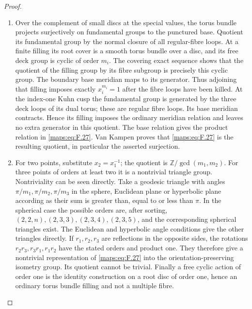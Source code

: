\documentclass[11pt,a4paper]{article}
\numberwithin{equation}{section}
\theoremstyle{definition}
\begin{document}
\begin{proof}
\begin{enumerate}[label=\arabic*.]
\item Over the complement of small discs at the special values,
the torus bundle projects surjectively on fundamental groups
to the punctured base.  Quotient its fundamental group by the
normal closure of all regular-fibre loops.  At a finite
filling its root cover is a smooth torus bundle over a disc,
and its free deck group is cyclic of order $m_i$.
The covering exact sequence shows that the quotient of the
filling group by its fibre subgroup is precisely this cyclic
group.  The boundary base meridian maps to its generator.
Thus adjoining that filling imposes exactly
$x_i^{m_i}=1$ after the fibre loops have been killed.
At the index-one Kuhn cusp the fundamental group is generated
by the three deck loops of its dual torus; these are regular
fibre loops.  Its base meridian contracts.  Hence its filling
imposes the ordinary meridian relation and leaves no extra
generator in this quotient.  The base relation gives the
product relation in \eqref{maps:eq:F.27}.  Van Kampen proves that \eqref{maps:eq:F.27} is
the resulting quotient, in particular the asserted surjection.

\item For two points, substitute $x_2=x_1^{-1}$; the quotient is
$\mathbb Z/\gcd(m_1,m_2)$.
For three points of orders at least two it is a nontrivial
triangle group.  Nontriviality can be seen directly.  Take a geodesic triangle
with angles $\pi/m_1,\pi/m_2,\pi/m_3$ in the sphere, Euclidean
plane or hyperbolic plane according as their sum is greater
than, equal to or less than $\pi$.
In the spherical case the possible orders are, after sorting,
$(2,2,n),(2,3,3),(2,3,4),(2,3,5)$, and the corresponding
spherical triangles exist.  The Euclidean and hyperbolic
angle conditions give the other triangles directly.
If $r_1,r_2,r_3$ are reflections in the opposite sides,
the rotations $r_2r_3,r_3r_1,r_1r_2$ have the stated
orders and product one.  They therefore give a nontrivial
representation of \eqref{maps:eq:F.27} into the orientation-preserving
isometry group.  Its quotient cannot be trivial.
Finally a free cyclic action of order one is the identity
construction on a root disc of order one, hence an ordinary
torus bundle filling and not a multiple fibre.

\end{enumerate}
\end{proof}
\end{document}
